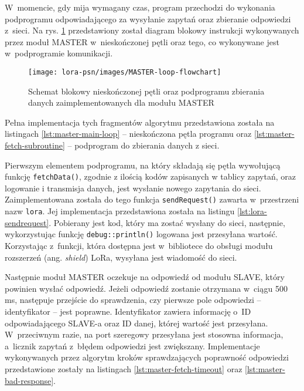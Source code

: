 W~momencie, gdy mija wymagany czas, program przechodzi do wykonania podprogramu odpowiadającego za wysyłanie zapytań
oraz zbieranie odpowiedzi z~sieci. Na rys. \ref{img:master-flowchart} przedstawiony został diagram blokowy instrukcji
wykonywanych przez moduł MASTER w~nieskończonej pętli oraz tego, co wykonywane jest w~podprogramie komunikacji.

\begin{figure}[!htbp]
    \centering
    \texttt{[image: lora-psn/images/MASTER-loop-flowchart]}
    \caption{\label{img:master-flowchart}Schemat blokowy nieskończonej pętli oraz podprogramu zbierania danych
        zaimplementowanych dla modułu MASTER}
\end{figure}

Pełna implementacja tych fragmentów algorytmu przedstawiona została na listingach \ref{lst:master-main-loop} --
nieskończona pętla programu oraz \ref{lst:master-fetch-subroutine} -- podprogram do zbierania danych z sieci.





\FloatBarrier
Pierwszym elementem podprogramu, na który składają się pętla wywołującą funkcję \texttt{fetchData()}, zgodnie z ilością
kodów zapisanych w tablicy zapytań, oraz logowanie i transmisja danych, jest wysłanie nowego zapytania do sieci.
Zaimplementowana została do tego funkcja \texttt{sendRequest()} zawarta w~przestrzeni nazw \texttt{lora}. Jej
implementacja przedstawiona została na listingu \ref{lst:lora-sendrequest}. Pobierany jest kod, który ma zostać wysłany
do sieci, następnie, wykorzystując funkcję \texttt{debug::println()} logowana jest przesyłana wartość. Korzystając
z~funkcji, która dostępna jest w~bibliotece do obsługi modułu rozszerzeń (ang. \textsl{shield}) LoRa, wysyłana jest
wiadomość do sieci.



\FloatBarrier
Następnie moduł MASTER oczekuje na odpowiedź od modułu SLAVE, który powinien wysłać odpowiedź. Jeżeli odpowiedź zostanie
otrzymana w~ciągu 500 ms, następuje przejście do sprawdzenia, czy pierwsze pole odpowiedzi -- identyfikator -- jest
poprawne. Identyfikator zawiera informację o~ID odpowiadającego SLAVE-a oraz ID danej, której wartość jest przesyłana.
W~przeciwnym razie, na port szeregowy przesyłana jest stosowna informacja, a~licznik zapytań z~błędem odpowiedzi jest
zwiększany. Implementacje wykonywanych przez algorytm kroków sprawdzających poprawność odpowiedzi przedstawione zostały
na listingach \ref{lst:master-fetch-timeout} oraz \ref{lst:master-bad-response}.

